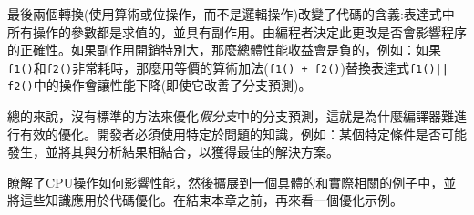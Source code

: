 最後兩個轉換(使用算術或位操作，而不是邏輯操作)改變了代碼的含義:表達式中所有操作的參數都是求值的，並具有副作用。由編程者決定此更改是否會影響程序的正確性。如果副作用開銷特別大，那麼總體性能收益會是負的，例如：如果\texttt{f1()}和\texttt{f2()}非常耗時，那麼用等價的算術加法(\texttt{f1() + f2()})替換表達式\texttt{f1()|| f2()}中的操作會讓性能下降(即使它改善了分支預測)。

總的來說，沒有標準的方法來優化\textit{假分支}中的分支預測，這就是為什麼編譯器難進行有效的優化。開發者必須使用特定於問題的知識，例如：某個特定條件是否可能發生，並將其與分析結果相結合，以獲得最佳的解決方案。

瞭解了CPU操作如何影響性能，然後擴展到一個具體的和實際相關的例子中，並將這些知識應用於代碼優化。在結束本章之前，再來看一個優化示例。



























